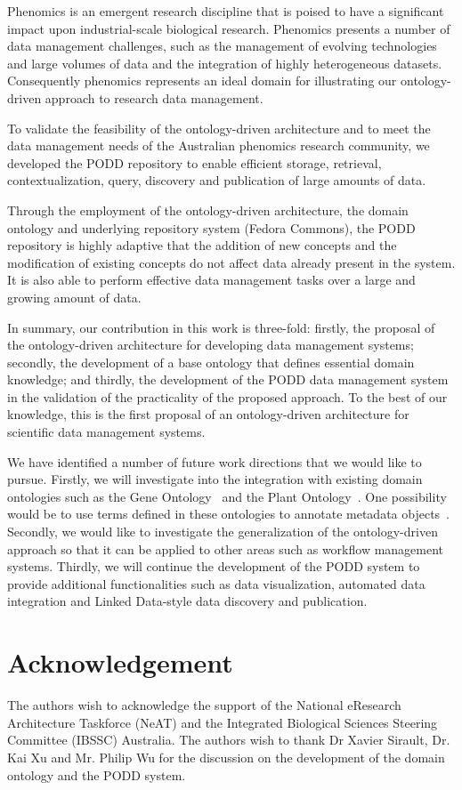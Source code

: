 \documentclass{elsarticle}
\begin{document}
Phenomics is an emergent research discipline that is poised to have
a significant impact upon industrial-scale biological research.
Phenomics presents a number of data management challenges, such as
the management of evolving technologies and large volumes of data
and the integration of highly heterogeneous datasets. Consequently
phenomics represents an ideal domain for illustrating our
ontology-driven approach to research data management.

To validate the feasibility of the ontology-driven architecture
and to meet the data management needs of the Australian phenomics
research community, we developed the PODD repository to enable
efficient storage, retrieval, contextualization, query, discovery
and publication of large amounts of data.

Through the employment of the ontology-driven architecture,
the domain ontology and underlying repository system (Fedora
Commons), the PODD repository is highly adaptive that
the addition of new concepts and the modification
of existing concepts do not affect data already present
in the system. It is also able to perform effective data
management tasks over a large and growing amount of data.

In summary, our contribution in this work is three-fold: firstly,
the proposal of the ontology-driven architecture for developing data
management systems; secondly, the development of a base ontology
that defines essential domain knowledge; and thirdly, the
development of the PODD data management system in the validation of
the practicality of the proposed approach. To the best of our
knowledge, this is the first proposal of an ontology-driven
architecture for scientific data management systems.

We have identified a number of future work directions that
we would like to pursue. Firstly, we will investigate into the
integration with existing domain ontologies such as the
Gene Ontology~\cite{citeulike:212874} and the Plant
Ontology~\cite{citeulike:3008167}. One possibility
would be to use terms defined in these ontologies to
annotate metadata objects~\cite{1419711}. Secondly, we would like to
investigate the generalization of the ontology-driven
approach so that it can be applied to other areas such
as workflow management systems.
Thirdly, we will continue the development of the PODD system
to provide additional functionalities such as
data visualization, automated data integration and
Linked Data-style data discovery and publication.

\section*{Acknowledgement}
The authors wish to acknowledge the support of the National
eResearch Architecture Taskforce (NeAT) and the Integrated
Biological Sciences Steering Committee (IBSSC) Australia. The authors wish to
thank Dr Xavier Sirault, Dr. Kai Xu and Mr. Philip Wu for
the discussion on the development of the domain ontology
and the PODD system.
\end{document}

